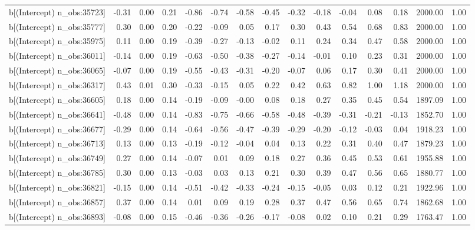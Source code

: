 \begin{table}[ht]
\begin{tabular}{rrrrrrrrrrrrrrr}
  b[(Intercept) n\_obs:35723] & -0.31 & 0.00 & 0.21 & -0.86 & -0.74 & -0.58 & -0.45 & -0.32 & -0.18 & -0.04 & 0.08 & 0.18 & 2000.00 & 1.00 \\ 
  b[(Intercept) n\_obs:35777] & 0.30 & 0.00 & 0.20 & -0.22 & -0.09 & 0.05 & 0.17 & 0.30 & 0.43 & 0.54 & 0.68 & 0.83 & 2000.00 & 1.00 \\ 
  b[(Intercept) n\_obs:35975] & 0.11 & 0.00 & 0.19 & -0.39 & -0.27 & -0.13 & -0.02 & 0.11 & 0.24 & 0.34 & 0.47 & 0.58 & 2000.00 & 1.00 \\ 
  b[(Intercept) n\_obs:36011] & -0.14 & 0.00 & 0.19 & -0.63 & -0.50 & -0.38 & -0.27 & -0.14 & -0.01 & 0.10 & 0.23 & 0.31 & 2000.00 & 1.00 \\ 
  b[(Intercept) n\_obs:36065] & -0.07 & 0.00 & 0.19 & -0.55 & -0.43 & -0.31 & -0.20 & -0.07 & 0.06 & 0.17 & 0.30 & 0.41 & 2000.00 & 1.00 \\ 
  b[(Intercept) n\_obs:36317] & 0.43 & 0.01 & 0.30 & -0.33 & -0.15 & 0.05 & 0.22 & 0.42 & 0.63 & 0.82 & 1.00 & 1.18 & 2000.00 & 1.00 \\ 
  b[(Intercept) n\_obs:36605] & 0.18 & 0.00 & 0.14 & -0.19 & -0.09 & -0.00 & 0.08 & 0.18 & 0.27 & 0.35 & 0.45 & 0.54 & 1897.09 & 1.00 \\ 
  b[(Intercept) n\_obs:36641] & -0.48 & 0.00 & 0.14 & -0.83 & -0.75 & -0.66 & -0.58 & -0.48 & -0.39 & -0.31 & -0.21 & -0.13 & 1852.70 & 1.00 \\ 
  b[(Intercept) n\_obs:36677] & -0.29 & 0.00 & 0.14 & -0.64 & -0.56 & -0.47 & -0.39 & -0.29 & -0.20 & -0.12 & -0.03 & 0.04 & 1918.23 & 1.00 \\ 
  b[(Intercept) n\_obs:36713] & 0.13 & 0.00 & 0.13 & -0.19 & -0.12 & -0.04 & 0.04 & 0.13 & 0.22 & 0.31 & 0.40 & 0.47 & 1879.23 & 1.00 \\ 
  b[(Intercept) n\_obs:36749] & 0.27 & 0.00 & 0.14 & -0.07 & 0.01 & 0.09 & 0.18 & 0.27 & 0.36 & 0.45 & 0.53 & 0.61 & 1955.88 & 1.00 \\ 
  b[(Intercept) n\_obs:36785] & 0.30 & 0.00 & 0.13 & -0.03 & 0.03 & 0.13 & 0.21 & 0.30 & 0.39 & 0.47 & 0.56 & 0.65 & 1880.77 & 1.00 \\ 
  b[(Intercept) n\_obs:36821] & -0.15 & 0.00 & 0.14 & -0.51 & -0.42 & -0.33 & -0.24 & -0.15 & -0.05 & 0.03 & 0.12 & 0.21 & 1922.96 & 1.00 \\ 
  b[(Intercept) n\_obs:36857] & 0.37 & 0.00 & 0.14 & 0.01 & 0.09 & 0.19 & 0.28 & 0.37 & 0.47 & 0.56 & 0.65 & 0.74 & 1862.68 & 1.00 \\ 
  b[(Intercept) n\_obs:36893] & -0.08 & 0.00 & 0.15 & -0.46 & -0.36 & -0.26 & -0.17 & -0.08 & 0.02 & 0.10 & 0.21 & 0.29 & 1763.47 & 1.00 \\ 

\end{tabular}
\end{table}
